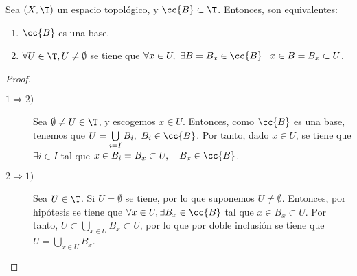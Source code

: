 \begin{prop} \label{prop:Caract_Base}
Sea $(X,\T)$ un espacio topológico, y $\cc{B}\subset \T$. Entonces, son equivalentes:
\begin{enumerate}
    \item $\cc{B}$ es una base.
    \item $\forall U\in \T,U\neq \emptyset$ se tiene que $\forall x\in U,~\exists B=B_x\in \cc{B}\mid x\in B=B_x\subset U$.
\end{enumerate}
\end{prop}
\begin{proof}\
    \begin{description}
        \item[$1\Longrightarrow 2)$] Sea $\emptyset\neq U\in \T$, y escogemos $x\in U$. Entonces, como $\cc{B}$ es una base, tenemos que $U=\bigcup\limits_{i=I}B_i,~ B_i\in \cc{B}$. Por tanto, dado $x\in U$, se tiene que $\exists i\in I$ tal que $x\in B_i=B_x\subset U,\quad B_x\in \cc{B}$.

        \item[$2\Longrightarrow 1)$] Sea $U\in \T$. Si $U=\emptyset$ se tiene, por lo que suponemos $U\neq \emptyset$. Entonces, por hipótesis se tiene que $\forall x\in U, \exists B_x\in \cc{B}$ tal que $x\in B_x\subset U$. Por tanto, $U\subset \bigcup\limits_{x\in U}B_x\subset U$, por lo que por doble inclusión se tiene que $U= \bigcup\limits_{x\in U}B_x$.
    \end{description}
\end{proof}
